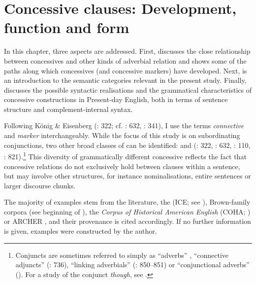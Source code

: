 \chapter{\label{bkm:Ref34993759}\label{bkm:Ref35421461}\label{bkm:Ref35521616}Concessive clauses: Development, function and form}\label{sec:2}

In this chapter, three aspects are addressed. First,  discusses the close relationship between concessives and other kinds of adverbial relation and shows some of the paths along which concessives (and concessive markers) have developed. Next,  is an introduction to the semantic categories relevant in the present study. Finally,  discusses the possible syntactic realisations and the grammatical characteristics of concessive constructions in Present-day English, both in terms of sentence structure and complement-internal syntax.

Following König \& Eisenberg (\citeyear{KönigEisenberg1984}: 322; cf. \citealt{König1991b}: 632, \citealt{KönigSiemund2000}: 341), I use the terms \textit{connective} and \textit{marker} interchangeably. While the focus of this study is on subordinating conjunctions, two other broad classes of  can be identified:  and  (\citealt{KönigEisenberg1984}: 322, \citealt{König1991b}: 632, \citealt{Hoffmann2005}: 110, \citealt{König2006}: 821).\footnote{Conjuncts are sometimes referred to simply as “adverbs” \citep[41]{Aarts1988}, “connective adjuncts” (\citealt{HuddlestonPullum2002}: 736), “linking adverbials” (\citealt{BiberEtAl1999}: 850–851) or “conjunctional adverbs” (\cites[821]{König2006}[632]{König1991b}[110]{Hoffmann2005}). For a study of the conjunct \textit{though}, see \citealt{Schützler2020a}.} This diversity of grammatically different concessive  reflects the fact that conces\-sive relations do not exclusively hold between clauses within a sentence, but may involve other structures, for instance nominalisations, entire sentences or larger discourse chunks.

The majority of examples stem from the literature, the \textit{} (ICE; see ), Brown-family corpora (see beginning of ), the \textit{Corpus of Historical American English} (COHA; \citealt{Davies2010}) or ARCHER \citep{Yáñez-Bouza2011}, and their provenance is cited accordingly. If no further information is given, examples were constructed by the author.

